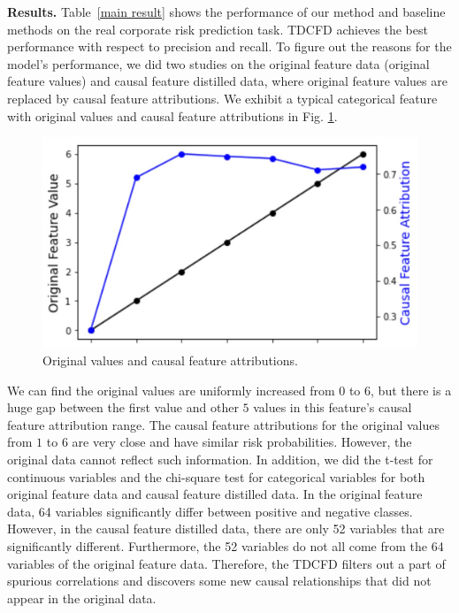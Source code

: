 \documentclass[letterpaper]{article} %
\theoremstyle{definition}
\theoremstyle{remark}
\begin{document}
\noindent\textbf{Results.} Table~\ref{main result} shows the performance of our method and baseline methods on the real corporate risk prediction task. TDCFD achieves the best performance with respect to precision and recall. To figure out the reasons for the model's performance, we did two studies on the original feature data (original feature values) and causal feature distilled data, where original feature values are replaced by causal feature attributions. We exhibit a typical categorical feature with original values and causal feature attributions in Fig. \ref{fig:compare}.
\begin{figure}
\centering
\includegraphics[width=0.7\linewidth]{compare.jpg}

\caption{Original values and causal feature attributions.}

\label{fig:compare}
\end{figure}
We can find the original values are uniformly increased from $0$ to $6$, but there is a huge gap between the first value and other $5$ values in this feature's causal feature attribution range. The causal feature attributions for the original values from $1$ to $6$ are very close and have similar risk probabilities. However, the original data cannot reflect such information. In addition, we did the t-test for continuous variables and the chi-square test for categorical variables for both original feature data and causal feature distilled data. In the original feature data, 64 variables significantly differ between positive and negative classes. However, in the causal feature distilled data, there are only 52 variables that are significantly different. Furthermore, the 52 variables do not all come from the 64 variables of the original feature data. Therefore, the TDCFD filters out a part of spurious correlations and discovers some new causal relationships that did not appear in the original data.
\end{document}
